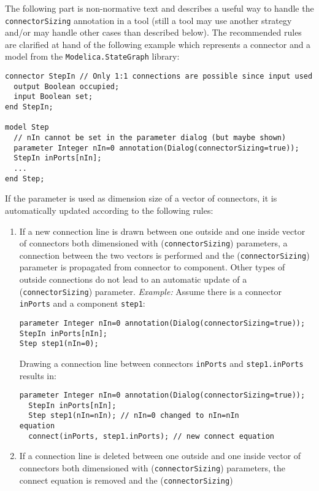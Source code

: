 \begin{nonnormative}
The following part is non-normative text and describes a useful
way to handle the \lstinline!connectorSizing! annotation in a tool (still a tool may
use another strategy and/or may handle other cases than described
below). The recommended rules are clarified at hand of the following
example which represents a connector and a model from the
\lstinline!Modelica.StateGraph! library:
\begin{lstlisting}[language=modelica]
connector StepIn // Only 1:1 connections are possible since input used
  output Boolean occupied;
  input Boolean set;
end StepIn;

model Step
  // nIn cannot be set in the parameter dialog (but maybe shown)
  parameter Integer nIn=0 annotation(Dialog(connectorSizing=true));
  StepIn inPorts[nIn];
  ...
end Step;
\end{lstlisting}
If the parameter is used as dimension size of a vector of
connectors, it is automatically updated according to the following
rules:
\begin{enumerate}
\item
  If a new connection line is drawn between one outside and one
  inside vector of connectors both dimensioned with (\lstinline!connectorSizing!)
  parameters, a connection between the two vectors is performed and the
  (\lstinline!connectorSizing!) parameter is propagated from connector to component.
  Other types of outside connections do not lead to an automatic update
  of a (\lstinline!connectorSizing!) parameter. \emph{Example:} Assume there is a
  connector \lstinline!inPorts! and a component \lstinline!step1!:
\begin{lstlisting}[language=modelica]
parameter Integer nIn=0 annotation(Dialog(connectorSizing=true));
StepIn inPorts[nIn];
Step step1(nIn=0);
\end{lstlisting}
  Drawing a connection line between connectors \lstinline!inPorts! and
  \lstinline!step1.inPorts! results in:
\begin{lstlisting}[language=modelica]
  parameter Integer nIn=0 annotation(Dialog(connectorSizing=true));
  StepIn inPorts[nIn];
  Step step1(nIn=nIn); // nIn=0 changed to nIn=nIn
equation
  connect(inPorts, step1.inPorts); // new connect equation
\end{lstlisting}
\item
  If a connection line is deleted between one outside and one
  inside vector of connectors both dimensioned with (\lstinline!connectorSizing!)
  parameters, the connect equation is removed and the (\lstinline!connectorSizing!)

\end{enumerate}
\end{nonnormative}

